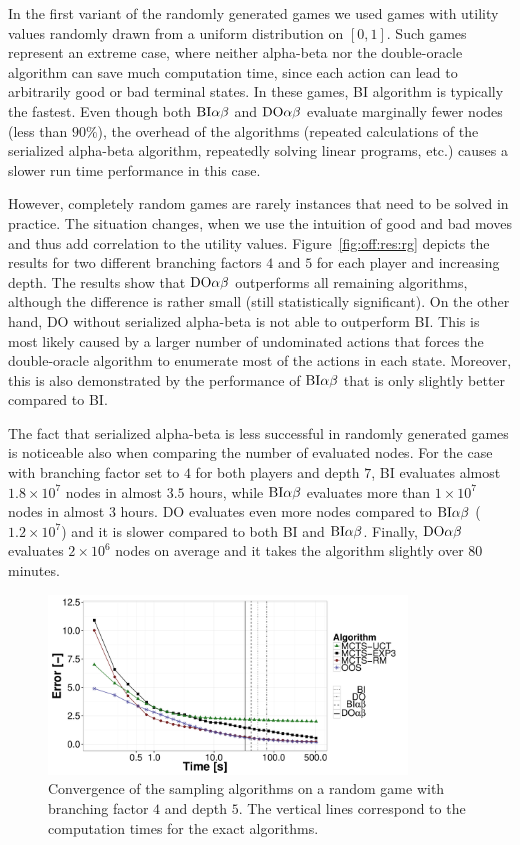 In the first variant of the randomly generated games we used games with utility values randomly drawn from a uniform distribution on $[0,1]$.
Such games represent an extreme case, where neither alpha-beta nor the double-oracle algorithm can save much computation time, since each action can lead to arbitrarily good or bad terminal states.
In these games, \textsc{BI} algorithm is typically the fastest.
Even though both $\textrm{BI}\alpha\beta$ and $\textrm{DO}\alpha\beta$ evaluate marginally fewer nodes (less than $90\%$), the overhead of the algorithms (repeated calculations of the serialized alpha-beta algorithm, repeatedly solving linear programs, etc.) causes a slower run time performance in this case.

However, completely random games are rarely instances that need to be solved in practice.
The situation changes, when we use the intuition of good and bad moves and thus add correlation to the utility values.
Figure~\ref{fig:off:res:rg} depicts the results for two different branching factors $4$ and $5$ for each player and increasing depth.
The results show that $\textrm{DO}\alpha\beta$ outperforms all remaining algorithms, although the difference is rather small (still statistically significant).
On the other hand, \textsc{DO} without serialized alpha-beta is not able to outperform \textsc{BI}.
This is most likely caused by a larger number of undominated actions that forces the double-oracle algorithm to enumerate most of the actions in each state.
Moreover, this is also demonstrated by the performance of $\textrm{BI}\alpha\beta$ that is only slightly better compared to \textsc{BI}.

The fact that serialized alpha-beta is less successful in randomly generated games is noticeable also when comparing the number of evaluated nodes.
For the case with branching factor set to $4$ for both players and depth $7$, \textsc{BI} evaluates almost $1.8\times10^7$ nodes in almost $3.5$ hours, while $\textrm{BI}\alpha\beta$ evaluates more than $1\times10^7$ nodes in almost $3$ hours.
\textsc{DO} evaluates even more nodes compared to $\textrm{BI}\alpha\beta$ ($1.2\times10^7$) and it is slower compared to both \textsc{BI} and $\textrm{BI}\alpha\beta$.
Finally, $\textrm{DO}\alpha\beta$ evaluates $2\times10^6$ nodes on average and it takes the algorithm slightly over $80$ minutes. 

\begin{figure}[t!]
\centering
\includegraphics[width=0.85\textwidth]{figures/convergence-rg.pdf}
\caption{Convergence of the sampling algorithms on a random game with branching factor $4$ and depth $5$. The vertical lines correspond to the computation times for the exact algorithms.} \label{fig:off:conv:rg}
\end{figure}

